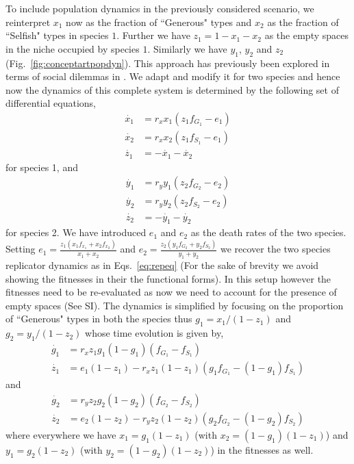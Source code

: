 \documentclass[12pt]{article}
\begin{document}
To include population dynamics in the previously considered scenario, we reinterpret $x_1$ now as the fraction of ``Generous" types and $x_2
$ as the fraction of ``Selfish" types in species $1$.
Further we have $z_1 = 1 - x_1 - x_2$ as the empty spaces in the niche occupied by species $1$. 
Similarly we have $y_1$, $y_2$ and $z_2$ (Fig.~\ref{fig:conceptartpopdyn}).
This approach has previously been explored in terms of social dilemmas in \citep{hauert:PRSB:2006}.
We adapt and modify it for two species and hence now the dynamics of this complete system is determined by the following set of differential equations,
%
\begin{align}
	\dot{x_1} &= r_x x_1 (z_1 f_{G_1} - e_1)  \\
	\dot{x_2} &= r_x x_2 (z_1 f_{S_1} - e_1) \\
	\dot{z_1} &= - \dot{x_1} - \dot{x_2} 
\end{align}
%
for species 1, and
%
\begin{align}
	\dot{y_1} &= r_y y_1 (z_2 f_{G_2} - e_2)  \\
	\dot{y_2} &= r_y y_2 (z_2 f_{S_2} - e_2) \\
	\dot{z_2} &= - \dot{y_1} - \dot{y_2} 
\end{align}
%
for species 2. 
We have introduced $e_1$ and $e_2$ as the death rates of the two species.
Setting $e_1 = \frac{z_1 (x_1 f_{x_1} + x_2 f_{x_2}) }{x_1 + x_2}$ and $e_2 = \frac{z_2 (y_1 f_{G_2} + y_2 f_{S_2}) }{y_1 + y_2}$ we recover the two species replicator dynamics as in Eqs.~\ref{eq:repeq} (For the sake of brevity we avoid showing the fitnesses in their the functional forms).
In this setup however the fitnesses need to be re-evaluated as now we need to account for the presence of empty spaces (See SI).
The dynamics is simplified by focusing on the proportion of ``Generous" types in both the species thus $g_1 = x_1/(1-z_1)$ and $g_2 = y_1/(1-z_2)$ whose time evolution is given by,
\begin{align}
	\dot{g_1} &= r_x z_1 g_1 (1-g_1) (f_{G_1} - f_{S_1})  \\
	\dot{z_1} &= e_1 (1-z_1) - r_x z_1 (1-z_1) (g_1 f_{G_1} -  (1-g_1) f_{S_1})
\end{align}
and
\begin{align}
	\dot{g_2} &= r_y z_2 g_2 (1-g_2) (f_{G_2} - f_{S_2})  \\
	\dot{z_2} &= e_2 (1-z_2) - r_y z_2 (1-z_2) (g_2 f_{G_2} -  (1-g_2) f_{S_2})
\end{align}
%
where everywhere we have $x_1 = g_1 (1-z_1)$ (with $x_2 = (1-g_1) (1-z_1)$) and $y_1 = g_2 (1-z_2)$ (with $y_2 = (1-g_2) (1-z_2)$) in the fitnesses as well.
\end{document}
